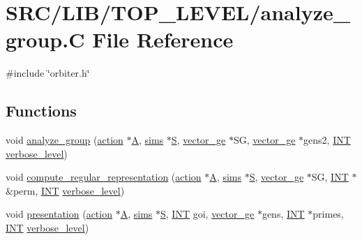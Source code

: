 \hypertarget{analyze__group_8_c}{}\section{S\+R\+C/\+L\+I\+B/\+T\+O\+P\+\_\+\+L\+E\+V\+E\+L/analyze\+\_\+group.C File Reference}
\label{analyze__group_8_c}
{\ttfamily \#include \char`\"{}orbiter.\+h\char`\"{}}\newline
\subsection*{Functions}
\begin{DoxyCompactItemize}
\item 
void \mbox{\hyperlink{analyze__group_8_c_acc445ef9d19e7fe78fbe1a057328958e}{analyze\+\_\+group}} (\mbox{\hyperlink{classaction}{action}} $\ast$\mbox{\hyperlink{simeon_8_c_a97833f04c3a9c008df5521a2fc291bb4}{A}}, \mbox{\hyperlink{classsims}{sims}} $\ast$\mbox{\hyperlink{simeon_8_c_adab47f8243f1b5a2c31df2535d6b37d0}{S}}, \mbox{\hyperlink{classvector__ge}{vector\+\_\+ge}} $\ast$SG, \mbox{\hyperlink{classvector__ge}{vector\+\_\+ge}} $\ast$gens2, \mbox{\hyperlink{galois_8h_a09fddde158a3a20bd2dcadb609de11dc}{I\+NT}} \mbox{\hyperlink{simeon_8_c_a818073fbcc2f439e7c56952f67386122}{verbose\+\_\+level}})
\item 
void \mbox{\hyperlink{analyze__group_8_c_ad48d02425a513bdf27e6a9b29e427af2}{compute\+\_\+regular\+\_\+representation}} (\mbox{\hyperlink{classaction}{action}} $\ast$\mbox{\hyperlink{simeon_8_c_a97833f04c3a9c008df5521a2fc291bb4}{A}}, \mbox{\hyperlink{classsims}{sims}} $\ast$\mbox{\hyperlink{simeon_8_c_adab47f8243f1b5a2c31df2535d6b37d0}{S}}, \mbox{\hyperlink{classvector__ge}{vector\+\_\+ge}} $\ast$SG, \mbox{\hyperlink{galois_8h_a09fddde158a3a20bd2dcadb609de11dc}{I\+NT}} $\ast$\&perm, \mbox{\hyperlink{galois_8h_a09fddde158a3a20bd2dcadb609de11dc}{I\+NT}} \mbox{\hyperlink{simeon_8_c_a818073fbcc2f439e7c56952f67386122}{verbose\+\_\+level}})
\item 
void \mbox{\hyperlink{analyze__group_8_c_ab037817a46d85b5e20c048f5e8382118}{presentation}} (\mbox{\hyperlink{classaction}{action}} $\ast$\mbox{\hyperlink{simeon_8_c_a97833f04c3a9c008df5521a2fc291bb4}{A}}, \mbox{\hyperlink{classsims}{sims}} $\ast$\mbox{\hyperlink{simeon_8_c_adab47f8243f1b5a2c31df2535d6b37d0}{S}}, \mbox{\hyperlink{galois_8h_a09fddde158a3a20bd2dcadb609de11dc}{I\+NT}} goi, \mbox{\hyperlink{classvector__ge}{vector\+\_\+ge}} $\ast$gens, \mbox{\hyperlink{galois_8h_a09fddde158a3a20bd2dcadb609de11dc}{I\+NT}} $\ast$primes, \mbox{\hyperlink{galois_8h_a09fddde158a3a20bd2dcadb609de11dc}{I\+NT}} \mbox{\hyperlink{simeon_8_c_a818073fbcc2f439e7c56952f67386122}{verbose\+\_\+level}})
\end{DoxyCompactItemize}


